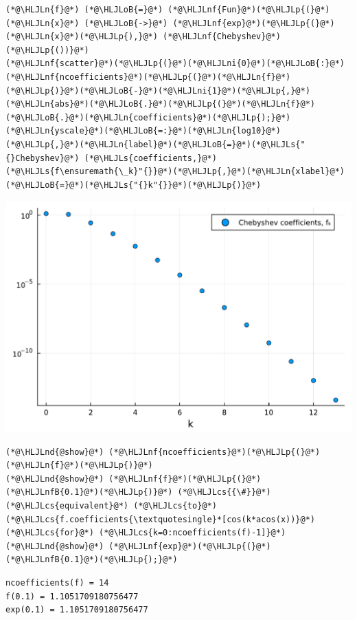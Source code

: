 \documentclass[12pt,a4paper]{article}
\newcommand{\HLJLn}[1]{#1}
\newcommand{\HLJLnd}[1]{\textcolor[RGB]{214,102,97}{#1}}
\newcommand{\HLJLnf}[1]{\textcolor[RGB]{66,102,213}{#1}}
\newcommand{\HLJLs}[1]{\textcolor[RGB]{201,61,57}{#1}}
\newcommand{\HLJLnfB}[1]{\textcolor[RGB]{59,151,46}{#1}}
\newcommand{\HLJLni}[1]{\textcolor[RGB]{59,151,46}{#1}}
\newcommand{\HLJLoB}[1]{\textcolor[RGB]{102,102,102}{\textbf{#1}}}
\newcommand{\HLJLp}[1]{#1}
\newcommand{\HLJLcs}[1]{\textcolor[RGB]{153,153,119}{\textit{#1}}}
\begin{document}
\begin{lstlisting}
(*@\HLJLn{f}@*) (*@\HLJLoB{=}@*) (*@\HLJLnf{Fun}@*)(*@\HLJLp{(}@*)(*@\HLJLn{x}@*) (*@\HLJLoB{->}@*) (*@\HLJLnf{exp}@*)(*@\HLJLp{(}@*)(*@\HLJLn{x}@*)(*@\HLJLp{),}@*) (*@\HLJLnf{Chebyshev}@*)(*@\HLJLp{())}@*)
(*@\HLJLnf{scatter}@*)(*@\HLJLp{(}@*)(*@\HLJLni{0}@*)(*@\HLJLoB{:}@*)(*@\HLJLnf{ncoefficients}@*)(*@\HLJLp{(}@*)(*@\HLJLn{f}@*)(*@\HLJLp{)}@*)(*@\HLJLoB{-}@*)(*@\HLJLni{1}@*)(*@\HLJLp{,}@*)(*@\HLJLn{abs}@*)(*@\HLJLoB{.}@*)(*@\HLJLp{(}@*)(*@\HLJLn{f}@*)(*@\HLJLoB{.}@*)(*@\HLJLn{coefficients}@*)(*@\HLJLp{);}@*)(*@\HLJLn{yscale}@*)(*@\HLJLoB{=:}@*)(*@\HLJLn{log10}@*)(*@\HLJLp{,}@*)(*@\HLJLn{label}@*)(*@\HLJLoB{=}@*)(*@\HLJLs{"{}Chebyshev}@*) (*@\HLJLs{coefficients,}@*) (*@\HLJLs{f\ensuremath{\_k}"{}}@*)(*@\HLJLp{,}@*)(*@\HLJLn{xlabel}@*)(*@\HLJLoB{=}@*)(*@\HLJLs{"{}k"{}}@*)(*@\HLJLp{)}@*)
\end{lstlisting}

\includegraphics[width=\linewidth]{jl_dOthw0/OP_methods_22_1.pdf}

\begin{lstlisting}
(*@\HLJLnd{@show}@*) (*@\HLJLnf{ncoefficients}@*)(*@\HLJLp{(}@*)(*@\HLJLn{f}@*)(*@\HLJLp{)}@*)
(*@\HLJLnd{@show}@*) (*@\HLJLnf{f}@*)(*@\HLJLp{(}@*)(*@\HLJLnfB{0.1}@*)(*@\HLJLp{)}@*) (*@\HLJLcs{{\#}}@*) (*@\HLJLcs{equivalent}@*) (*@\HLJLcs{to}@*) (*@\HLJLcs{f.coefficients{\textquotesingle}*[cos(k*acos(x))}@*) (*@\HLJLcs{for}@*) (*@\HLJLcs{k=0:ncoefficients(f)-1]}@*)
(*@\HLJLnd{@show}@*) (*@\HLJLnf{exp}@*)(*@\HLJLp{(}@*)(*@\HLJLnfB{0.1}@*)(*@\HLJLp{);}@*)
\end{lstlisting}

\begin{lstlisting}
ncoefficients(f) = 14
f(0.1) = 1.1051709180756477
exp(0.1) = 1.1051709180756477
\end{lstlisting}
\end{document}
